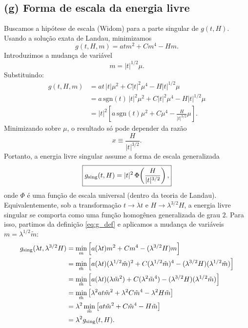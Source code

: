 \documentclass[11pt,a4paper]{article}
\begin{document}
\subsection*{(g) Forma de escala da energia livre}
%
Buscamos a hipótese de escala (Widom) para a parte singular de $g(t, H)$. Usando a solução exata de Landau, minimizamos
%
\begin{equation}
    g(t, H, m) = a t m^2 + C m^4 - H m.
\label{eq:g_def}    
\end{equation}
%
Introduzimos a mudança de variável
%
\begin{equation}
    m = |t|^{1/2} \mu.
\end{equation}
%
Substituindo:
%
\begin{align}
    g(t, H, m) &= a t \, |t| \mu^2 + C |t|^2 \mu^4 - H |t|^{1/2} \mu \\
    &= a \, \text{sgn}(t) \, |t|^2 \mu^2 + C |t|^2 \mu^4 - H |t|^{1/2} \mu \\
    &= |t|^2 \left[ a \, \text{sgn}(t) \mu^2 + C \mu^4 - \frac{H}{|t|^{3/2}} \mu \right].
\end{align}
%
Minimizando sobre $\mu$, o resultado só pode depender da razão
%
\begin{equation}
    x \equiv \frac{H}{|t|^{3/2}}.
\end{equation}
%
Portanto, a energia livre singular assume a forma de escala generalizada
%
\begin{equation}
    \boxed{
    g_{\rm sing}(t, H) = |t|^{2} \, \Phi\!\left( \frac{H}{|t|^{3/2}} \right),
    }
\end{equation}
%
onde $\Phi$ é uma função de escala universal (dentro da teoria de Landau).
%
Equivalentemente, sob a transformação $t \to \lambda t$ e $H \to \lambda^{3/2} H$, a energia livre singular se comporta como uma função homogênea generalizada de grau $2$. Para isso, partimos da definição \eqref{eq:g_def} e aplicamos a mudança de variáveis $m = \lambda^{1/2} \tilde{m}$:
%
\begin{align}
    g_{\rm sing}(\lambda t, \lambda^{3/2} H)
    &= \min_{m} \left[ a (\lambda t) m^2 + C m^4 - (\lambda^{3/2} H) m \right] \\
    &= \min_{\tilde{m}} \left[ a (\lambda t) (\lambda^{1/2} \tilde{m})^2 + C (\lambda^{1/2} \tilde{m})^4 - (\lambda^{3/2} H) (\lambda^{1/2} \tilde{m}) \right] \\
    &= \min_{\tilde{m}} \left[ a (\lambda t) (\lambda \tilde{m}^2) + C (\lambda^2 \tilde{m}^4) - (\lambda^{3/2} H) (\lambda^{1/2} \tilde{m}) \right] \\
    &= \min_{\tilde{m}} \left[ \lambda^2 a t \tilde{m}^2 + \lambda^2 C \tilde{m}^4 - \lambda^2 H \tilde{m} \right] \\
    &= \lambda^2 \min_{\tilde{m}} \left[ a t \tilde{m}^2 + C \tilde{m}^4 - H \tilde{m} \right] \\
    &= \lambda^2 g_{\rm sing}(t, H).
\end{align}
\end{document}

